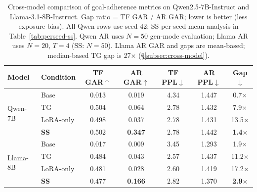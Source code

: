 \begin{table}[t]
\centering
\caption{Cross-model comparison of goal-adherence metrics on Qwen2.5-7B-Instruct and Llama-3.1-8B-Instruct.
Gap ratio = TF GAR / AR GAR; lower is better (less exposure bias).
All Qwen rows use seed 42; SS per-seed mean analysis in Table~\ref{tab:perseed-ss}.
Qwen AR uses $N{=}50$ gen-mode evaluation; Llama AR uses $N{=}20$, $T{=}4$ (SS: $N{=}50$).
Llama AR GAR and gaps are mean-based; median-based TG gap is 27$\times$ (\S\ref{subsec:cross-model}).}
\label{tab:crossmodel-detail}
\small
\begin{tabular}{@{}ll ccccc@{}}
\toprule
\textbf{Model} & \textbf{Condition} & \textbf{TF GAR}$\uparrow$ & \textbf{AR GAR}$\uparrow$ & \textbf{TF PPL}$\downarrow$ & \textbf{AR PPL}$\downarrow$ & \textbf{Gap}$\downarrow$ \\
\midrule
\multirow{4}{*}{Qwen-7B}
  & Base      & 0.013 & 0.019 & 4.34 & 1.447 & 0.7$\times$ \\
  & TG        & 0.504 & 0.064 & 2.78 & 1.432 & 7.9$\times$ \\
  & LoRA-only & 0.498 & 0.037 & 2.78 & 1.431 & 13.5$\times$ \\
  & \textbf{SS} & 0.502 & \textbf{0.347} & 2.78 & 1.442 & \textbf{1.4$\times$} \\
\midrule
\multirow{4}{*}{Llama-8B}
  & Base      & 0.017 & 0.009 & 3.45 & 1.293 & 1.9$\times$ \\
  & TG        & 0.484 & 0.043 & 2.57 & 1.437 & 11.2$\times$ \\
  & LoRA-only & 0.481 & 0.028 & 2.60 & 1.419 & 17.2$\times$ \\
  & \textbf{SS} & 0.477 & \textbf{0.166} & 2.82 & 1.370 & \textbf{2.9$\times$} \\
\bottomrule
\end{tabular}
\end{table}
